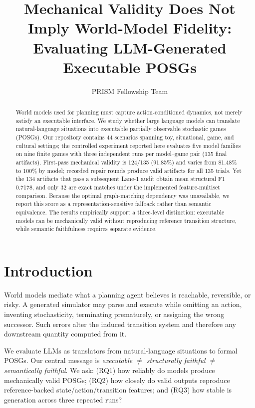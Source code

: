 \documentclass{article}
\title{Mechanical Validity Does Not Imply World-Model Fidelity:\\Evaluating LLM-Generated Executable POSGs}
\author{PRISM Fellowship Team}
\begin{document}
\maketitle

\begin{abstract}
World models used for planning must capture action-conditioned dynamics, not
merely satisfy an executable interface. We study whether large language models
can translate natural-language situations into executable partially observable
stochastic games (POSGs). Our repository contains 44 scenarios spanning toy,
situational, game, and cultural settings; the controlled experiment reported
here evaluates five model families on nine finite games with three independent
runs per model--game pair (135 final artifacts). First-pass mechanical validity
is 124/135 (91.85\%) and varies from 81.48\% to 100\% by model; recorded repair
rounds produce valid artifacts for all 135 trials. Yet the 134 artifacts that
pass a subsequent Lane-1 audit obtain mean structural F1 0.7178, and only 32
are exact matches under the implemented feature-multiset comparison. Because
the optimal graph-matching dependency was unavailable, we report this score as
a representation-sensitive fallback rather than semantic equivalence. The
results empirically support a three-level distinction: executable models can be
mechanically valid without reproducing reference transition structure, while
semantic faithfulness requires separate evidence.
\end{abstract}

\section{Introduction}
World models mediate what a planning agent believes is reachable, reversible,
or risky. A generated simulator may parse and execute while omitting an action,
inventing stochasticity, terminating prematurely, or assigning the wrong
successor. Such errors alter the induced transition system and therefore any
downstream quantity computed from it.

We evaluate LLMs as translators from natural-language situations to formal
POSGs. Our central message is \emph{executable $\neq$ structurally faithful
$\neq$ semantically faithful}. We ask: (RQ1) how reliably do models produce
mechanically valid POSGs; (RQ2) how closely do valid outputs reproduce
reference-backed state/action/transition features; and (RQ3) how stable is
generation across three repeated runs?
\end{document}
